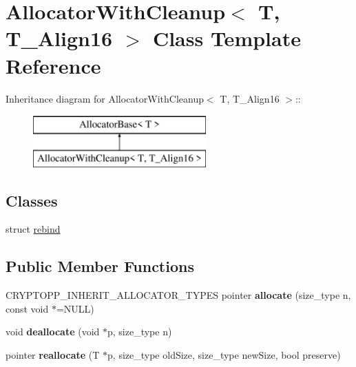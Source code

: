 \hypertarget{class_allocator_with_cleanup}{
\section{AllocatorWithCleanup$<$ T, T\_\-Align16 $>$ Class Template Reference}
\label{class_allocator_with_cleanup}
}
Inheritance diagram for AllocatorWithCleanup$<$ T, T\_\-Align16 $>$::\begin{figure}[H]
\begin{center}
\leavevmode
\includegraphics[height=2cm]{class_allocator_with_cleanup}
\end{center}
\end{figure}
\subsection*{Classes}
\begin{DoxyCompactItemize}
\item 
struct \hyperlink{struct_allocator_with_cleanup_1_1rebind}{rebind}
\end{DoxyCompactItemize}
\subsection*{Public Member Functions}
\begin{DoxyCompactItemize}
\item 
\hypertarget{class_allocator_with_cleanup_a1c23c8527d336c4249e2d0fee2ba5538}{
CRYPTOPP\_\-INHERIT\_\-ALLOCATOR\_\-TYPES pointer {\bfseries allocate} (size\_\-type n, const void $\ast$=NULL)}
\label{class_allocator_with_cleanup_a1c23c8527d336c4249e2d0fee2ba5538}

\item 
\hypertarget{class_allocator_with_cleanup_a59c577b531bfb3ffcdb9f59589917082}{
void {\bfseries deallocate} (void $\ast$p, size\_\-type n)}
\label{class_allocator_with_cleanup_a59c577b531bfb3ffcdb9f59589917082}

\item 
\hypertarget{class_allocator_with_cleanup_a3f2099086655e07cbe75fa995b24a8d4}{
pointer {\bfseries reallocate} (T $\ast$p, size\_\-type oldSize, size\_\-type newSize, bool preserve)}
\label{class_allocator_with_cleanup_a3f2099086655e07cbe75fa995b24a8d4}

\end{DoxyCompactItemize}
